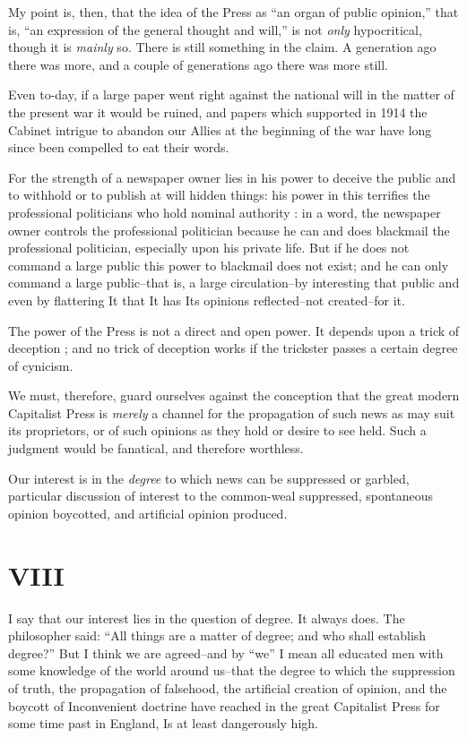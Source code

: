 \documentclass{book}
\begin{document}
My point is, then, that the idea of the Press as “an organ of public opinion,” that is, “an expression of the general thought and will,” is not \emph{only} hypocritical, though it is \emph{mainly} so. There is still something in the claim. A generation ago there was more, and a couple of generations ago there was more still.

Even to-day, if a large paper went right against the national will in the matter of the present war it would be ruined, and papers which supported in 1914 the Cabinet intrigue to abandon our Allies at the beginning of the war have long since been compelled to eat their words.

For the strength of a newspaper owner lies in his power to deceive the public and to withhold or to publish at will hidden things: his power in this terrifies the professional politicians who hold nominal authority : in a word, the newspaper owner controls the professional politician because he can and does blackmail the professional politician, especially upon his private life. But if he does not command a large public this power to blackmail does not exist; and he can only command a large public–that is, a large circulation–by interesting that public and even by flattering It that It has Its opinions reflected–not created–for it.

The power of the Press is not a direct and open power. It depends upon a trick of deception ; and no trick of deception works if the trickster passes a certain degree of cynicism.

We must, therefore, guard ourselves against the conception that the great modern Capitalist Press is \emph{merely} a channel for the propagation of such news as may suit its proprietors, or of such opinions as they hold or desire to see held. Such a judgment would be fanatical, and therefore worthless.

Our interest is in the \emph{degree} to which news can be suppressed or garbled, particular discussion of interest to the common-weal suppressed, spontaneous opinion boycotted, and artificial opinion produced.

\chapter*{VIII}
\label{chapter-9}
I say that our interest lies in the question of degree. It always does. The philosopher said: “All things are a matter of degree; and who shall establish degree?” But I think we are agreed–and by “we” I mean all educated men with some knowledge of the world around us–that the degree to which the suppression of truth, the propagation of falsehood, the artificial creation of opinion, and the boycott of Inconvenient doctrine have reached in the great Capitalist Press for some time past in England, Is at least dangerously high.
\end{document}
